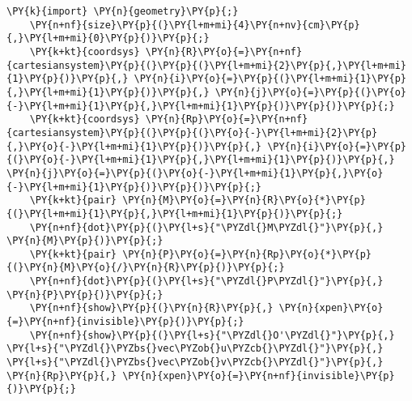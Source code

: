 \begin{Verbatim}[commandchars=\\\{\}]
    \PY{k}{import} \PY{n}{geometry}\PY{p}{;}
    \PY{n+nf}{size}\PY{p}{(}\PY{l+m+mi}{4}\PY{n+nv}{cm}\PY{p}{,}\PY{l+m+mi}{0}\PY{p}{)}\PY{p}{;}
    \PY{k+kt}{coordsys} \PY{n}{R}\PY{o}{=}\PY{n+nf}{cartesiansystem}\PY{p}{(}\PY{p}{(}\PY{l+m+mi}{2}\PY{p}{,}\PY{l+m+mi}{1}\PY{p}{)}\PY{p}{,} \PY{n}{i}\PY{o}{=}\PY{p}{(}\PY{l+m+mi}{1}\PY{p}{,}\PY{l+m+mi}{1}\PY{p}{)}\PY{p}{,} \PY{n}{j}\PY{o}{=}\PY{p}{(}\PY{o}{-}\PY{l+m+mi}{1}\PY{p}{,}\PY{l+m+mi}{1}\PY{p}{)}\PY{p}{)}\PY{p}{;}
    \PY{k+kt}{coordsys} \PY{n}{Rp}\PY{o}{=}\PY{n+nf}{cartesiansystem}\PY{p}{(}\PY{p}{(}\PY{o}{-}\PY{l+m+mi}{2}\PY{p}{,}\PY{o}{-}\PY{l+m+mi}{1}\PY{p}{)}\PY{p}{,} \PY{n}{i}\PY{o}{=}\PY{p}{(}\PY{o}{-}\PY{l+m+mi}{1}\PY{p}{,}\PY{l+m+mi}{1}\PY{p}{)}\PY{p}{,} \PY{n}{j}\PY{o}{=}\PY{p}{(}\PY{o}{-}\PY{l+m+mi}{1}\PY{p}{,}\PY{o}{-}\PY{l+m+mi}{1}\PY{p}{)}\PY{p}{)}\PY{p}{;}
    \PY{k+kt}{pair} \PY{n}{M}\PY{o}{=}\PY{n}{R}\PY{o}{*}\PY{p}{(}\PY{l+m+mi}{1}\PY{p}{,}\PY{l+m+mi}{1}\PY{p}{)}\PY{p}{;}
    \PY{n+nf}{dot}\PY{p}{(}\PY{l+s}{"\PYZdl{}M\PYZdl{}"}\PY{p}{,} \PY{n}{M}\PY{p}{)}\PY{p}{;}
    \PY{k+kt}{pair} \PY{n}{P}\PY{o}{=}\PY{n}{Rp}\PY{o}{*}\PY{p}{(}\PY{n}{M}\PY{o}{/}\PY{n}{R}\PY{p}{)}\PY{p}{;}
    \PY{n+nf}{dot}\PY{p}{(}\PY{l+s}{"\PYZdl{}P\PYZdl{}"}\PY{p}{,} \PY{n}{P}\PY{p}{)}\PY{p}{;}
    \PY{n+nf}{show}\PY{p}{(}\PY{n}{R}\PY{p}{,} \PY{n}{xpen}\PY{o}{=}\PY{n+nf}{invisible}\PY{p}{)}\PY{p}{;}
    \PY{n+nf}{show}\PY{p}{(}\PY{l+s}{"\PYZdl{}O'\PYZdl{}"}\PY{p}{,} \PY{l+s}{"\PYZdl{}\PYZbs{}vec\PYZob{}u\PYZcb{}\PYZdl{}"}\PY{p}{,} \PY{l+s}{"\PYZdl{}\PYZbs{}vec\PYZob{}v\PYZcb{}\PYZdl{}"}\PY{p}{,} \PY{n}{Rp}\PY{p}{,} \PY{n}{xpen}\PY{o}{=}\PY{n+nf}{invisible}\PY{p}{)}\PY{p}{;}
\end{Verbatim}
